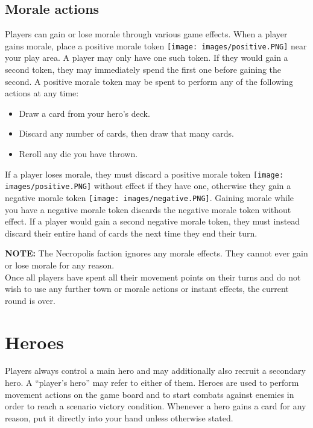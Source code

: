 \documentclass[12pt]{article}
\begin{document}
\subsection*{Morale actions}
Players can gain or lose morale through various game effects. When a player gains morale, place a positive morale token \texttt{[image: images/positive.PNG]} near your play area. A player may only have one such token. If they would gain a second token, they may immediately spend the first one before gaining the second. A positive morale token may be spent to perform any of the following actions at any time:
\begin{itemize}
\item Draw a card from your hero's deck.
\item Discard any number of cards, then draw that many cards.
\item Reroll any die you have thrown.
\end{itemize}
If a player loses morale, they must discard a positive morale token \texttt{[image: images/positive.PNG]} without effect if they have one, otherwise they gain a negative morale token \texttt{[image: images/negative.PNG]}. Gaining morale while you have a negative morale token discards the negative morale token without effect. If a player would gain a second negative morale token, they must instead discard their entire hand of cards the next time they end their turn.\par
\textbf{NOTE:} The Necropolis faction ignores any morale effects. They cannot ever gain or lose morale for any reason.\\[12pt]
Once all players have spent all their movement points on their turns and do not wish to use any further town or morale actions or instant effects, the current round is over.\par

\clearpage

\section[Heroes]{Heroes\hypertarget{Heroes}{}}
Players always control a main hero and may additionally also recruit a secondary hero. A “player’s hero” may refer to either of them. Heroes are used to perform movement actions on the game board and to start combats against enemies in order to reach a scenario victory condition. Whenever a hero gains a card for any reason, put it directly into your hand unless otherwise stated. 
\end{document}
